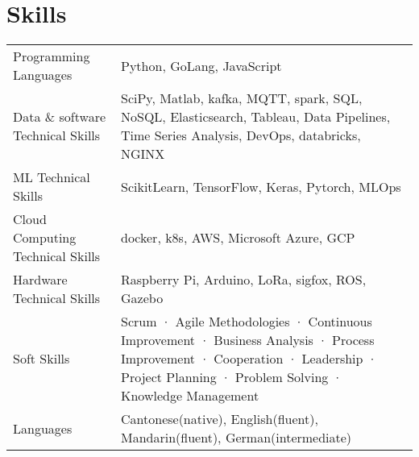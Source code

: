 \documentclass[a4paper,12pt]{article}
\begin{document}

\section{Skills}
\begin{tabularx}{\linewidth}{@{}l X@{}}
Programming Languages & \normalsize{Python, GoLang, JavaScript}\\
Data \& software Technical Skills &  \normalsize{SciPy, Matlab, kafka, MQTT, spark, SQL, NoSQL, Elasticsearch, Tableau, Data Pipelines, Time Series Analysis, DevOps, databricks, NGINX}\\
ML Technical Skills & \normalsize{ScikitLearn, TensorFlow, Keras, Pytorch, MLOps} \\
Cloud Computing Technical Skills &  \normalsize{docker, k8s, AWS, Microsoft Azure, GCP} \\
Hardware Technical Skills & \normalsize{Raspberry Pi, Arduino, LoRa, sigfox, ROS, Gazebo}\\
Soft Skills  &  \normalsize{Scrum · Agile Methodologies · Continuous Improvement · Business Analysis · Process Improvement · Cooperation · Leadership · Project Planning · Problem Solving · Knowledge Management}\\  
Languages & \normalsize{Cantonese(native), English(fluent), Mandarin(fluent), German(intermediate)}
\end{tabularx}

\vfill
{}
\end{document}
